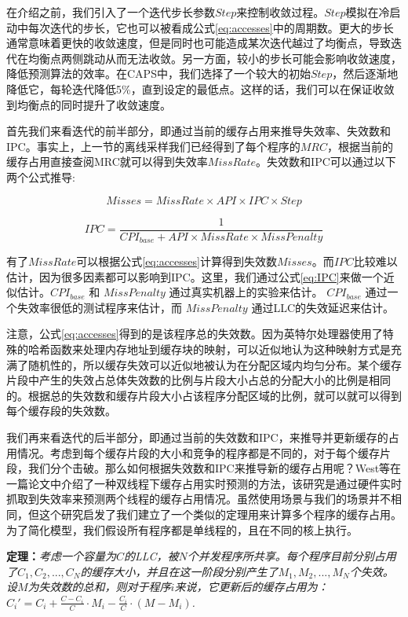 在介绍之前，我们引入了一个迭代步长参数$Step$来控制收敛过程。$Step$模拟在冷启动中每次迭代的步长，它也可以被看成公式\ref{eq:accesses}中的周期数。更大的步长通常意味着更快的收敛速度，但是同时也可能造成某次迭代越过了均衡点，导致迭代在均衡点两侧跳动从而无法收敛。另一方面，较小的步长可能会影响收敛速度，降低预测算法的效率。在CAPS中，我们选择了一个较大的初始$Step$，然后逐渐地降低它，每轮迭代降低5\%，直到设定的最低点。这样的话，我们可以在保证收敛到均衡点的同时提升了收敛速度。

首先我们来看迭代的前半部分，即通过当前的缓存占用来推导失效率、失效数和IPC。事实上，上一节的离线采样我们已经得到了每个程序的$MRC$，根据当前的缓存占用直接查阅MRC就可以得到失效率$MissRate$。失效数和IPC可以通过以下两个公式推导:

\begin{equation}
Misses = MissRate \times API \times IPC \times Step 
\label{eq:accesses}
\end{equation}

\begin{equation}
IPC = \frac{1}{CPI_{base} + API \times MissRate \times MissPenalty}
\label{eq:IPC}
\end{equation}

有了$MissRate$可以根据公式\ref{eq:accesses}计算得到失效数$Misses$。而$IPC$比较难以估计，因为很多因素都可以影响到IPC。这里，我们通过公式\ref{eq:IPC}来做一个近似估计。$CPI_{base}$ 和 $MissPenalty$ 通过真实机器上的实验来估计。 $CPI_{base}$ 通过一个失效率很低的测试程序来估计，而 $MissPenalty$ 通过LLC的失效延迟来估计。   

注意，公式\ref{eq:accesses}得到的是该程序总的失效数。因为英特尔处理器使用了特殊的哈希函数来处理内存地址到缓存块的映射，可以近似地认为这种映射方式是充满了随机性的，所以缓存失效可以近似地被认为在分配区域内均匀分布。某个缓存片段中产生的失效占总体失效数的比例与片段大小占总的分配大小的比例是相同的。根据总的失效数和缓存片段大小占该程序分配区域的比例，就可以就可以得到每个缓存段的失效数。

我们再来看迭代的后半部分，即通过当前的失效数和IPC，来推导并更新缓存的占用情况。考虑到每个缓存片段的大小和竞争的程序都是不同的，对于每个缓存片段，我们分个击破。那么如何根据失效数和IPC来推导新的缓存占用呢？West等在一篇论文中介绍了一种双线程下缓存占用实时预测的方法\parencite{west2010online}，该研究是通过硬件实时抓取到失效率来预测两个线程的缓存占用情况。虽然使用场景与我们的场景并不相同，但这个研究启发了我们建立了一个类似的定理用来计算多个程序的缓存占用。为了简化模型，我们假设所有程序都是单线程的，且在不同的核上执行。

\textbf{定理：}\emph{考虑一个容量为$C$的LLC，被$N$个并发程序所共享。每个程序目前分别占用了$C_1, C_2, ... , C_N$的缓存大小，并且在这一阶段分别产生了$M_1, M_2, ... , M_N$个失效。设$M$为失效数的总和，则对于程序$i$来说，它更新后的缓存占用为：$C_i' = C_i + \frac{C-C_i}{C} \cdot M_i - \frac{C_i}{C} \cdot (M-M_i)$.}

